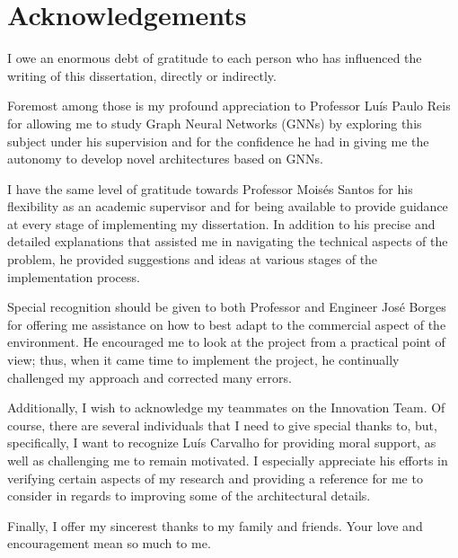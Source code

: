 \chapter*{Acknowledgements}


I owe an enormous debt of gratitude to each person who has influenced the writing of this dissertation, directly or indirectly.

Foremost among those is my profound appreciation to Professor Luís Paulo Reis for allowing me to study Graph Neural Networks (GNNs) by exploring this subject under his supervision and for the confidence he had in giving me the autonomy to develop novel architectures based on GNNs.

I have the same level of gratitude towards Professor Moisés Santos for his flexibility as an academic supervisor and for being available to provide guidance at every stage of implementing my dissertation. In addition to his precise and detailed explanations that assisted me in navigating the technical aspects of the problem, he provided suggestions and ideas at various stages of the implementation process.

Special recognition should be given to both Professor and Engineer José Borges for offering me assistance on how to best adapt to the commercial aspect of the environment. He encouraged me to look at the project from a practical point of view; thus, when it came time to implement the project, he continually challenged my approach and corrected many errors.

Additionally, I wish to acknowledge my teammates on the Innovation Team. Of course, there are several individuals that I need to give special thanks to, but, specifically, I want to recognize Luís Carvalho for providing moral support, as well as challenging me to remain motivated. I especially appreciate his efforts in verifying certain aspects of my research and providing a reference for me to consider in regards to improving some of the architectural details.

Finally, I offer my sincerest thanks to my family and friends. Your love and encouragement mean so much to me.



\vspace{10mm}
